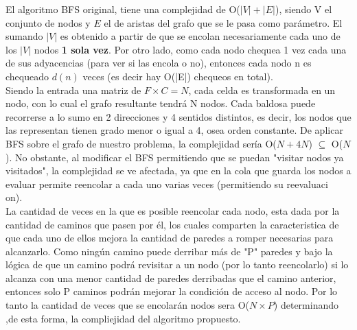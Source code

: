  El algoritmo BFS original, tiene una complejidad de O($|V|+|E|$), siendo V el conjunto de nodos y $E$ el de aristas del grafo que se le pasa como parámetro. El sumando $|V|$ es obtenido a partir de que se encolan necesariamente cada uno de los $|V|$ nodos {\bf 1 sola vez}. Por otro lado, como cada nodo chequea 1 vez cada una de sus adyacencias (para ver si las encola o no), entonces cada nodo n es chequeado $d(n)$ veces (es decir hay O(|E|) chequeos en total). \\

Siendo la entrada una matriz de $F \times C = N$, cada celda es transformada en un nodo, con lo cual el grafo resultante tendrá N nodos. Cada baldosa puede recorrerse a lo sumo en 2 direcciones y 4 sentidos distintos, es decir, los nodos que las representan tienen grado menor o igual a 4, osea orden constante. De aplicar BFS sobre el grafo de nuestro problema, la complejidad sería O($N + 4N$) $\subseteq$ O($N$).
No obstante, al modificar el BFS permitiendo que se puedan "visitar nodos ya visitados", la complejidad se ve afectada, ya que en la cola que guarda los nodos a evaluar permite reencolar a cada uno varias veces (permitiendo su reevaluaci\\on).\\

La cantidad de veces en la que es posible reencolar cada nodo, esta dada por la cantidad de caminos que pasen por él, los cuales comparten la caracteristica de que cada uno de ellos mejora la cantidad de paredes a romper necesarias para alcanzarlo. Como ningún camino puede derribar más de "P" paredes y bajo la l\'ogica de que un camino podrá revisitar a un nodo (por lo tanto reencolarlo) si lo alcanza con una menor cantidad de paredes derribadas que el camino anterior, entonces solo P caminos podrán mejorar la condición de acceso al nodo. Por lo tanto la cantidad de veces que se encolarán nodos sera O($N \times P$) determinando ,de esta forma, la compliejidad del algoritmo propuesto.






